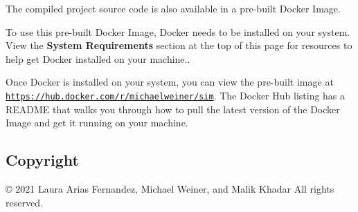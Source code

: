 The compiled project source code is also available in a pre-\/built Docker Image.

To use this pre-\/built Docker Image, Docker needs to be installed on your system. View the {\bfseries System Requirements} section at the top of this page for resources to help get Docker installed on your machine..

Once Docker is installed on your system, you can view the pre-\/built image at \href{https://hub.docker.com/r/michaelweiner/sim}{\tt https\+://hub.\+docker.\+com/r/michaelweiner/sim}. The Docker Hub listing has a {\ttfamily R\+E\+A\+D\+ME} that walks you through how to pull the latest version of the Docker Image and get it running on your machine.

\subsection*{Copyright}

\copyright{} 2021 Laura Arias Fernandez, Michael Weiner, and Malik Khadar All rights reserved. 